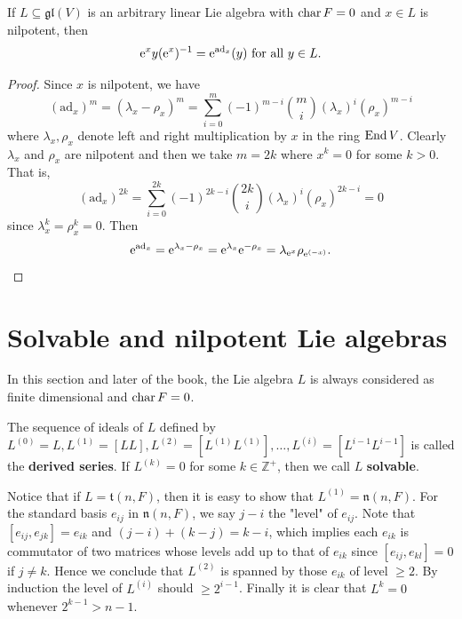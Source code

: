 \begin{proposition}
    If $L \subseteq \mathfrak{gl}(V)$ is an arbitrary linear Lie algebra with $\operatorname{char} F =0 $ and $x\in L$ is nilpotent, then 
    \begin{equation*}
        \mathrm{e}^x y (\mathrm{e}^x)^{-1} = \mathrm{e}^{\operatorname{ad}_x} (y) \text{ for all } y \in L.
    \end{equation*}
\end{proposition}
\begin{proof}
    Since $x$ is nilpotent, we have 
    \begin{equation*}
        (\text{ad}_x)^m = (\lambda_x - \rho_x)^m = \sum_{i=0}^m (-1)^{m-i} \binom{m}{i} (\lambda_x)^i (\rho_x)^{m-i}
    \end{equation*}
    where $\lambda_x, \rho_x$ denote left and right multiplication by $x$ in the ring $\operatorname{End} V$. Clearly $\lambda_x$ and $\rho_x$ are nilpotent and then we take $m=2k$ where $x^k=0$ for some $k>0$. That is, 
    \begin{equation*}
        (\text{ad}_x)^{2k} = \sum_{i=0}^{2k} (-1)^{2k-i} \binom{2k}{i} (\lambda_x)^i (\rho_x)^{2k-i}=0
    \end{equation*}
    since $\lambda_x^k=\rho_x^k=0$. Then 
    \begin{equation*}
        \mathrm{e}^{\operatorname{ad}_x}=\mathrm{e}^{\lambda_x-\rho_x}=\mathrm{e}^{\lambda_x}\mathrm{e}^{-\rho_x}=\lambda_{\mathrm{e}^x}\rho_{\mathrm{e}^{(-x)}}.
    \end{equation*}
\end{proof}

\section{Solvable and nilpotent Lie algebras}
In this section and later of the book, the Lie algebra $L$ is always considered as finite dimensional and $\operatorname{char} F=0$.

\begin{definition}
    The sequence of ideals of $L$ defined by $L^{(0)}=L, L^{(1)}=[LL], L^{(2)}=[L^{(1)}L^{(1)}], \ldots, L^{(i)}=[L^{i-1}L^{i-1}]$ is called the \textbf{derived series}. If $L^{(k)}=0$ for some $k \in \mathbb{Z}^{+}$, then we call $L $ \textbf{solvable}.
\end{definition}
\begin{example}
    Notice that if $L=\mathfrak{t}(n,F)$, then it is easy to show that $L^{(1)}=\mathfrak{n}(n,F)$. For the standard basis $e_{ij}$ in $\mathfrak{n}(n,F)$, we say $j-i$ the "level" of $e_{ij}$. Note that $[e_{ij},e_{jk}]=e_{ik}$ and $(j-i)+(k-j)=k-i$, which implies each $e_{ik}$ is commutator of two matrices whose levels add up to that of $e_{ik}$ since $[e_{ij},e_{kl}]=0$ if $j\neq k$. Hence we conclude that $L^{(2)}$ is spanned by those $e_{ik}$ of level $\geqslant 2$. By induction the level of $L^{(i)}$ should $\geqslant 2^{i-1}$. Finally it is clear that $L^{k}=0$ whenever $2^{k-1}>n-1$.
\end{example}

